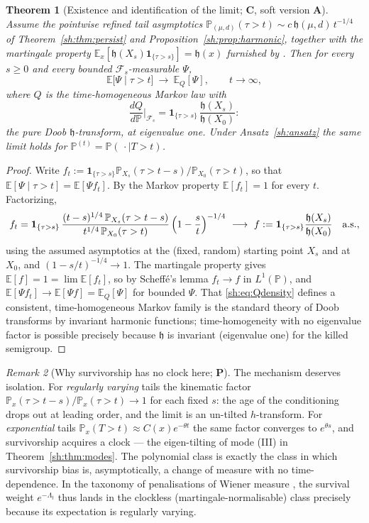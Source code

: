 \documentclass[11pt]{article}
\numberwithin{equation}{section}
\theoremstyle{plain}
\newtheorem{theorem}{Theorem}[section]
\theoremstyle{definition}
\theoremstyle{remark}
\newtheorem{remark}[theorem]{Remark}
\newcommand{\E}{\mathbb{E}}
\newcommand{\PP}{\mathbb{P}}
\newcommand{\one}{\mathbf{1}}
\newcommand{\Fc}{\mathcal{F}}
\newcommand{\hm}{\mathfrak{h}}
\begin{document}
\begin{theorem}[Existence and identification of the limit;
\textbf{C}, soft version \textbf{A}]\label{sh:thm:Q}
Assume the pointwise refined tail asymptotics
$\PP_{(\mu,d)}(\tau>t)\sim c\,\hm(\mu,d)\,t^{-1/4}$ of
Theorem~\ref{sh:thm:persist} and
Proposition~\ref{sh:prop:harmonic}, together with the martingale property
$\E_{x}[\hm(X_s)\one_{\{\tau>s\}}]=\hm(x)$ furnished by \cite{GJW99}.
Then for every $s\ge0$ and every bounded $\Fc_s$-measurable $\Psi$,
\[
\E\bigl[\Psi\mid\tau>t\bigr]\ \longrightarrow\ \E_Q[\Psi],
\qquad t\to\infty,
\]
where $Q$ is the time-homogeneous Markov law with
\begin{equation}\label{sh:eq:Qdensity}
\frac{dQ}{d\PP}\Big|_{\Fc_s}
=\one_{\{\tau>s\}}\,\frac{\hm(X_s)}{\hm(X_0)} :
\end{equation}
the \emph{pure} Doob $\hm$-transform, at eigenvalue one. Under
Ansatz~\ref{sh:ansatz} the same limit holds for
$\PP^{(t)}=\PP(\,\cdot\mid T>t)$.
\end{theorem}

\begin{proof}
Write $f_t:=\one_{\{\tau>s\}}\PP_{X_s}(\tau>t-s)/\PP_{X_0}(\tau>t)$, so
that $\E[\Psi\mid\tau>t]=\E[\Psi f_t]$. By the Markov property
$\E[f_t]=1$ for every $t$. Factorizing,
\[
f_t=\one_{\{\tau>s\}}\,
\frac{(t-s)^{1/4}\,\PP_{X_s}(\tau>t-s)}{t^{1/4}\,\PP_{X_0}(\tau>t)}
\,\Bigl(1-\frac st\Bigr)^{-1/4}
\ \longrightarrow\
f:=\one_{\{\tau>s\}}\frac{\hm(X_s)}{\hm(X_0)}
\quad\text{a.s.},
\]
using the assumed asymptotics at the (fixed, random) starting point
$X_s$ and at $X_0$, and $(1-s/t)^{-1/4}\to1$. The martingale property
gives $\E[f]=1=\lim\E[f_t]$, so by Scheff\'e's lemma $f_t\to f$ in
$L^1(\PP)$, and $\E[\Psi f_t]\to\E[\Psi f]=\E_Q[\Psi]$ for bounded
$\Psi$. That \eqref{sh:eq:Qdensity} defines a consistent, time-homogeneous
Markov family is the standard theory of Doob transforms by invariant
harmonic functions; time-homogeneity with no eigenvalue factor is
possible precisely because $\hm$ is invariant (eigenvalue one) for the
killed semigroup.
\end{proof}

\begin{remark}[Why survivorship has no clock here; \textbf{P}]
\label{sh:rem:noclock}
The mechanism deserves isolation. For \emph{regularly varying} tails the
kinematic factor $\PP_x(\tau>t-s)/\PP_x(\tau>t)\to1$ for each fixed $s$:
the age of the conditioning drops out at leading order, and the limit is
an un-tilted $h$-transform. For \emph{exponential} tails
$\PP_x(T>t)\approx C(x)e^{-\theta t}$ the same factor converges to
$e^{\theta s}$, and survivorship acquires a clock --- the eigen-tilting
of mode (III) in Theorem~\ref{sh:thm:modes}. The polynomial class is
exactly the class in which survivorship bias is, asymptotically, a
change of measure with no time-dependence. In the taxonomy of
penalisations of Wiener measure \cite{RVY06}, the survival weight
$e^{-\Lambda_t}$ thus lands in the clockless (martingale-normalisable)
class precisely because its expectation is regularly varying.
\end{remark}
\end{document}

